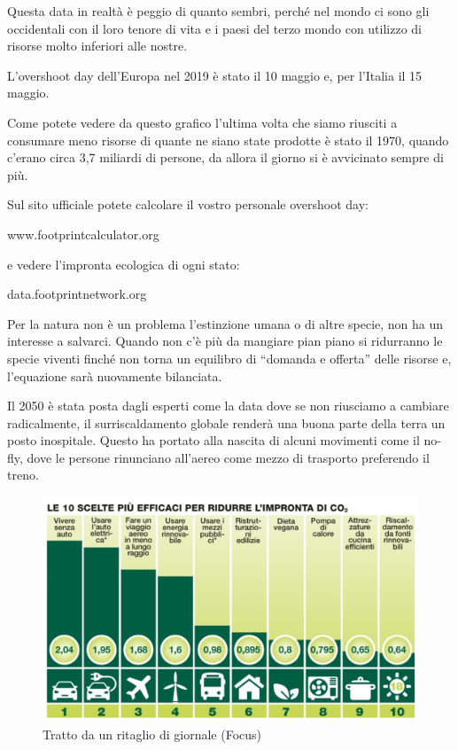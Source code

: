 \documentclass[12pt]{book} %
\begin{document}
Questa data in realtà è peggio di quanto sembri, perché nel mondo ci sono gli occidentali con il loro tenore di vita e i
paesi del terzo mondo con utilizzo di risorse molto inferiori alle nostre.

L'overshoot day dell'Europa nel 2019 è stato il 10 maggio e, per l'Italia il
15 maggio.

Come potete vedere da questo grafico l'ultima volta che siamo riusciti a consumare meno risorse di
quante ne siano state prodotte è stato il 1970, quando c'erano circa 3,7 miliardi di persone, da
allora il giorno si è avvicinato sempre di
più.

\bigskip

Sul sito ufficiale potete calcolare il vostro personale overshoot day:

www.footprintcalculator.org 

e vedere l'impronta ecologica di ogni stato:

data.footprintnetwork.org


\bigskip



Per la natura non è un problema l'estinzione umana o di altre specie, non ha un interesse a
salvarci. Quando non c'è più da mangiare pian piano si ridurranno le specie viventi finché non
torna un equilibro di “domanda e offerta” delle risorse e, l'equazione sarà nuovamente bilanciata.

\bigskip

Il 2050 è stata posta dagli esperti come la data dove se non riusciamo a cambiare radicalmente, il surriscaldamento
globale renderà una buona parte della terra un posto inospitale. Questo ha portato alla nascita di alcuni movimenti come il no-fly, dove le persone rinunciano all'aereo come mezzo di trasporto
preferendo il treno.

\needspace{4cm}
\begin{figure}[H]
  \centering
  \includegraphics[width=0.95\linewidth]{images/Libro-img019.jpg}
  \caption{Tratto da un ritaglio di giornale (Focus)}
\end{figure}
\end{document}
